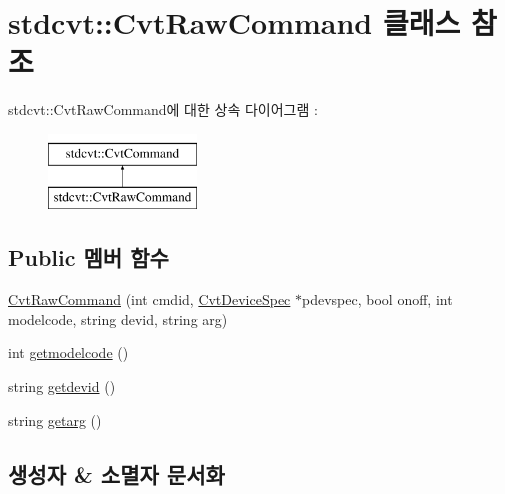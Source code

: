 \hypertarget{classstdcvt_1_1CvtRawCommand}{}\section{stdcvt\+:\+:Cvt\+Raw\+Command 클래스 참조}
\label{classstdcvt_1_1CvtRawCommand}
stdcvt\+:\+:Cvt\+Raw\+Command에 대한 상속 다이어그램 \+: \begin{figure}[H]
\begin{center}
\leavevmode
\includegraphics[height=2.000000cm]{classstdcvt_1_1CvtRawCommand}
\end{center}
\end{figure}
\subsection*{Public 멤버 함수}
\begin{DoxyCompactItemize}
\item 
\hyperlink{classstdcvt_1_1CvtRawCommand_ae42522abd4b67a651ecdc04b9ca53862}{Cvt\+Raw\+Command} (int cmdid, \hyperlink{classstdcvt_1_1CvtDeviceSpec}{Cvt\+Device\+Spec} $\ast$pdevspec, bool onoff, int modelcode, string devid, string arg)
\item 
int \hyperlink{classstdcvt_1_1CvtRawCommand_ad7377cc0531f970032368e5518211e8c}{getmodelcode} ()
\item 
string \hyperlink{classstdcvt_1_1CvtRawCommand_a1ea00736911fff856e7d01b9fbd6d49d}{getdevid} ()
\item 
string \hyperlink{classstdcvt_1_1CvtRawCommand_a2429ee7b28de85a56203666d6aeda6de}{getarg} ()
\end{DoxyCompactItemize}


\subsection{생성자 \& 소멸자 문서화}
